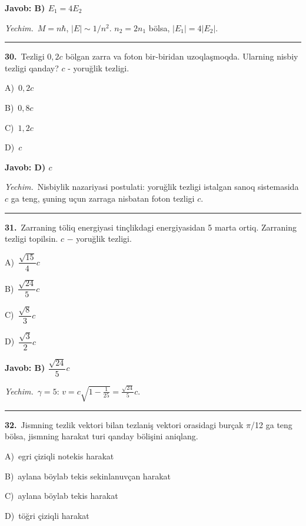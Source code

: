 \documentclass[11pt,a4paper]{article}
\newcommand{\opt}[2]{\hspace*{4mm}#1)\ #2\par}
\begin{document}
\noindent\colorbox{gray!12}{\parbox{\dimexpr\linewidth-2\fboxsep}{\textbf{Javob: B) $E_1 = 4E_2$}}}\par\smallskip
\noindent\textit{Yechim.}\ $M=n\hbar$, $|E|\sim1/n^2$. $n_2=2n_1$ bölsa, $|E_1|=4|E_2|$.\par\par\medskip\hrule\medskip
{}\noindent\begin{minipage}{\linewidth}
\textbf{30.}\ Tezligi $0{,}2c$ bölgan zarra va foton bir-biridan uzoqlaşmoqda. Ularning nisbiy tezligi qanday? $c$ - yoruğlik tezligi.\par\smallskip
\opt{A}{$0{,}2c$}
\opt{B}{$0{,}8c$}
\opt{C}{$1{,}2c$}
\opt{D}{$c$}
\end{minipage}\vspace{2pt}\par
\noindent\colorbox{gray!12}{\parbox{\dimexpr\linewidth-2\fboxsep}{\textbf{Javob: D) $c$}}}\par\smallskip
\noindent\textit{Yechim.}\ Nisbiylik nazariyasi postulati: yoruğlik tezligi istalgan sanoq sistemasida $c$ ga teng, şuning uçun zarraga nisbatan foton tezligi $c$.\par\par\medskip\hrule\medskip
{}\noindent\begin{minipage}{\linewidth}
\textbf{31.}\ Zarraning töliq energiyasi tinçlikdagi energiyasidan 5 marta ortiq. Zarraning tezligi topilsin. $c$ $-$ yoruğlik tezligi.\par\smallskip
\opt{A}{$\dfrac{\sqrt{15}}{4}c$}
\opt{B}{$\dfrac{\sqrt{24}}{5}c$}
\opt{C}{$\dfrac{\sqrt{8}}{3}c$}
\opt{D}{$\dfrac{\sqrt{3}}{2}c$}
\end{minipage}\vspace{2pt}\par
\noindent\colorbox{gray!12}{\parbox{\dimexpr\linewidth-2\fboxsep}{\textbf{Javob: B) $\dfrac{\sqrt{24}}{5}c$}}}\par\smallskip
\noindent\textit{Yechim.}\ $\gamma=5$: $v=c\sqrt{1-\frac1{25}}=\frac{\sqrt{24}}{5}c$.\par\par\medskip\hrule\medskip
{}\noindent\begin{minipage}{\linewidth}
\textbf{32.}\ Jismning tezlik vektori bilan tezlaniş vektori orasidagi burçak $\pi$/12 ga teng bölsa, jismning harakat turi qanday bölişini aniqlang.\par\smallskip
\opt{A}{egri çiziqli notekis harakat}
\opt{B}{aylana böylab tekis sekinlanuvçan harakat}
\opt{C}{aylana böylab tekis harakat}
\opt{D}{töğri çiziqli harakat}
\end{minipage}\vspace{2pt}\par
\end{document}
